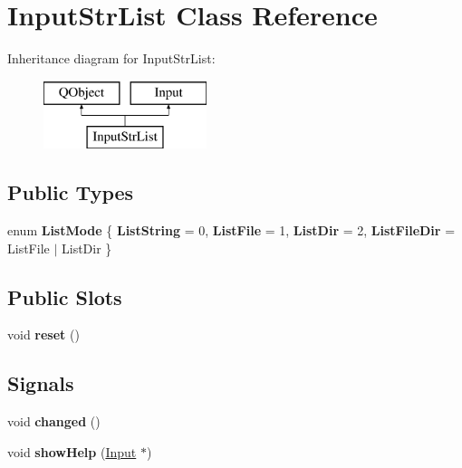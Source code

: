 \hypertarget{class_input_str_list}{}\section{Input\+Str\+List Class Reference}
\label{class_input_str_list}
Inheritance diagram for Input\+Str\+List\+:\begin{figure}[H]
\begin{center}
\leavevmode
\includegraphics[height=2.000000cm]{class_input_str_list}
\end{center}
\end{figure}
\subsection*{Public Types}
\begin{DoxyCompactItemize}
\item 
\mbox{\label{class_input_str_list_a8f78ed184bdeaa050c24608ad4a05833}} 
enum {\bfseries List\+Mode} \{ {\bfseries List\+String} = 0, 
{\bfseries List\+File} = 1, 
{\bfseries List\+Dir} = 2, 
{\bfseries List\+File\+Dir} = List\+File $\vert$ List\+Dir
 \}
\end{DoxyCompactItemize}
\subsection*{Public Slots}
\begin{DoxyCompactItemize}
\item 
\mbox{\label{class_input_str_list_a9b8a78f1b4a3ae2d5c047b4fe89570b7}} 
void {\bfseries reset} ()
\end{DoxyCompactItemize}
\subsection*{Signals}
\begin{DoxyCompactItemize}
\item 
\mbox{\label{class_input_str_list_abbfc0dffb1bb70988e08b373678768a3}} 
void {\bfseries changed} ()
\item 
\mbox{\label{class_input_str_list_a34ce8ee59c4fc4a6717821e9557e1116}} 
void {\bfseries show\+Help} (\mbox{\hyperlink{class_input}{Input}} $\ast$)
\end{DoxyCompactItemize}
